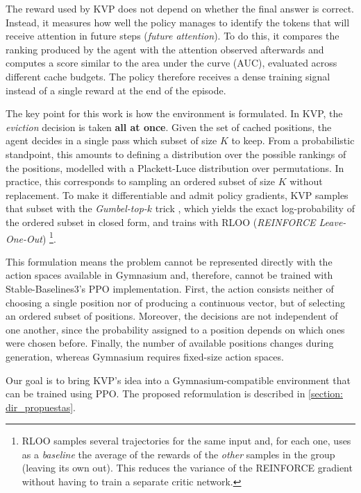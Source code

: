 The reward used by KVP does not depend on whether the final answer is correct. Instead, it measures how well the policy manages to identify the tokens that will receive attention in future steps (\emph{future attention}). To do this, it compares the ranking produced by the agent with the attention observed afterwards and computes a score similar to the area under the curve (AUC), evaluated across different cache budgets. The policy therefore receives a dense training signal instead of a single reward at the end of the episode.

The key point for this work is how the environment is formulated. In KVP, the \textit{eviction} decision is taken \textbf{all at once}.
Given the set of cached positions, the agent decides in a single pass which subset of size $K$ to keep.
From a probabilistic standpoint, this amounts to defining a distribution over the possible rankings of the positions, modelled with a Plackett-Luce distribution \cite{plackett1975analysis} over permutations. In practice, this corresponds to sampling an ordered subset of size $K$ without replacement.
To make it differentiable and admit policy gradients, KVP samples that subset with the \emph{Gumbel-top-$k$} trick \cite{kool2019gumbeltopk}, which yields the exact log-probability of the ordered subset in closed form, and trains with RLOO (\textit{REINFORCE Leave-One-Out}) \cite{ahmadian2024rloo}\footnote{RLOO samples several trajectories for the same input and, for each one, uses as a \emph{baseline} the average of the rewards of the \emph{other} samples in the group (leaving its own out). This reduces the variance of the REINFORCE gradient without having to train a separate critic network.}.

This formulation means the problem cannot be represented directly with the action spaces available in Gymnasium and, therefore, cannot be trained with Stable-Baselines3's PPO implementation. First, the action consists neither of choosing a single position nor of producing a continuous vector, but of selecting an ordered subset of positions. Moreover, the decisions are not independent of one another, since the probability assigned to a position depends on which ones were chosen before. Finally, the number of available positions changes during generation, whereas Gymnasium requires fixed-size action spaces.

Our goal is to bring KVP's idea into a Gymnasium-compatible environment that can be trained using PPO. The proposed reformulation is described in \cref{section: dir_propuestas}.

